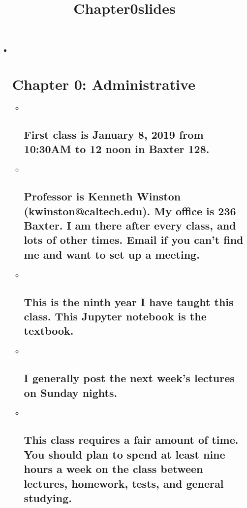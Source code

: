 \documentclass[11pt]{article}
\title{Chapter0slides}
\begin{document}
    
    
    \maketitle
    
    

    
    \begin{itemize}
\item ~
  \section{Chapter 0: Administrative}\label{chapter-0-administrative}

  \begin{itemize}
  \item ~
    \subsection{First class is January 8, 2019 from 10:30AM to 12 noon
    in Baxter
    128.}\label{first-class-is-january-8-2019-from-1030am-to-12-noon-in-baxter-128.}
  \item ~
    \subsection{Professor is Kenneth Winston (kwinston@caltech.edu). My
    office is 236 Baxter. I am there after every class, and lots of
    other times. Email if you can't find me and want to set up a
    meeting.}\label{professor-is-kenneth-winston-kwinstoncaltech.edu.-my-office-is-236-baxter.-i-am-there-after-every-class-and-lots-of-other-times.-email-if-you-cant-find-me-and-want-to-set-up-a-meeting.}
  \item ~
    \subsection{This is the ninth year I have taught this class. This
    Jupyter notebook is the
    textbook.}\label{this-is-the-ninth-year-i-have-taught-this-class.-this-jupyter-notebook-is-the-textbook.}
  \item ~
    \subsection{I generally post the next week's lectures on Sunday
    nights.}\label{i-generally-post-the-next-weeks-lectures-on-sunday-nights.}
  \item ~
    \subsection{This class requires a fair amount of time. You should
    plan to spend at least nine hours a week on the class between
    lectures, homework, tests, and general
    studying.}\label{this-class-requires-a-fair-amount-of-time.-you-should-plan-to-spend-at-least-nine-hours-a-week-on-the-class-between-lectures-homework-tests-and-general-studying.}
  \end{itemize}
\end{itemize}
\end{document}
